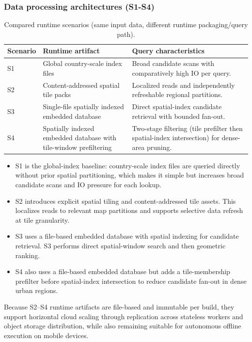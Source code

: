 \documentclass{article}
\begin{document}
\subsubsection{Data processing architectures (S1-S4)}
\begin{table}[!htbp]
\centering
\caption{Compared runtime scenarios (same input data, different runtime packaging/query path).}
\label{tab:scenario_overview}
\begin{tabular}{p{1.4cm}p{3.1cm}p{5.9cm}}
\toprule
Scenario & Runtime artifact & Query characteristics \\
\midrule
S1 & Global country-scale index files & Broad candidate scans with comparatively high IO per query. \\
S2 & Content-addressed spatial tile packs & Localized reads and independently refreshable regional partitions. \\
S3 & Single-file spatially indexed embedded database & Direct spatial-index candidate retrieval with bounded fan-out. \\
S4 & Spatially indexed embedded database with tile-window prefiltering & Two-stage filtering (tile prefilter then spatial-index intersection) for dense-area pruning. \\
\bottomrule
\end{tabular}
\end{table}


\begin{itemize}
\item  S1 is the global-index baseline: country-scale index files are queried directly without prior spatial partitioning, which makes it simple but increases broad candidate scans and IO pressure for each lookup.

\item  S2 introduces explicit spatial tiling and content-addressed tile assets. This localizes reads to relevant map partitions and supports selective data refresh at tile granularity.

\item  S3 uses a file-based embedded database with spatial indexing for candidate retrieval. S3 performs direct spatial-window search and then geometric ranking. 

\item S4 also uses a file-based embedded database but adds a tile-membership prefilter before spatial-index intersection to reduce candidate fan-out in dense urban regions.



\end{itemize}
Because S2--S4 runtime artifacts are file-based and immutable per build, they support horizontal cloud scaling through replication across stateless workers and object storage distribution, while also remaining suitable for autonomous offline execution on mobile devices.
\end{document}
